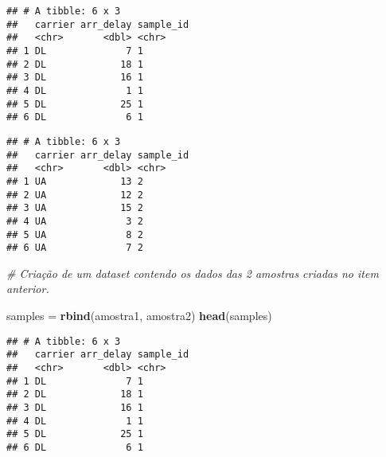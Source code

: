 \documentclass[]{article}
\newenvironment{Shaded}{\begin{snugshade}}{\end{snugshade}}
\newcommand{\CommentTok}[1]{\textcolor[rgb]{0.56,0.35,0.01}{\textit{#1}}}
\newcommand{\DataTypeTok}[1]{\textcolor[rgb]{0.13,0.29,0.53}{#1}}
\newcommand{\DecValTok}[1]{\textcolor[rgb]{0.00,0.00,0.81}{#1}}
\newcommand{\KeywordTok}[1]{\textcolor[rgb]{0.13,0.29,0.53}{\textbf{#1}}}
\newcommand{\NormalTok}[1]{#1}
\newcommand{\OperatorTok}[1]{\textcolor[rgb]{0.81,0.36,0.00}{\textbf{#1}}}
\newcommand{\StringTok}[1]{\textcolor[rgb]{0.31,0.60,0.02}{#1}}
\begin{document}
\begin{verbatim}
## # A tibble: 6 x 3
##   carrier arr_delay sample_id
##   <chr>       <dbl> <chr>    
## 1 DL              7 1        
## 2 DL             18 1        
## 3 DL             16 1        
## 4 DL              1 1        
## 5 DL             25 1        
## 6 DL              6 1
\end{verbatim}

\begin{Shaded}
\end{Shaded}

\begin{verbatim}
## # A tibble: 6 x 3
##   carrier arr_delay sample_id
##   <chr>       <dbl> <chr>    
## 1 UA             13 2        
## 2 UA             12 2        
## 3 UA             15 2        
## 4 UA              3 2        
## 5 UA              8 2        
## 6 UA              7 2
\end{verbatim}

\begin{Shaded}
\begin{Highlighting}[]
\CommentTok{# Criação de um dataset contendo os dados das 2 amostras criadas no item anterior. }

\NormalTok{samples =}\StringTok{ }\KeywordTok{rbind}\NormalTok{(amostra1, amostra2)}
\KeywordTok{head}\NormalTok{(samples)}
\end{Highlighting}
\end{Shaded}

\begin{verbatim}
## # A tibble: 6 x 3
##   carrier arr_delay sample_id
##   <chr>       <dbl> <chr>    
## 1 DL              7 1        
## 2 DL             18 1        
## 3 DL             16 1        
## 4 DL              1 1        
## 5 DL             25 1        
## 6 DL              6 1
\end{verbatim}
\end{document}

